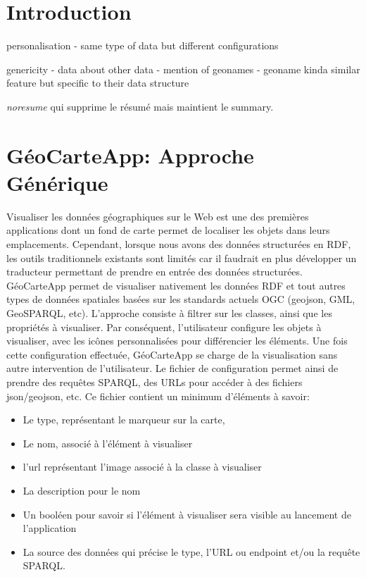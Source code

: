 \documentclass[a4paper,pagenum,french,showlayout]{rnti}
\affiliation{
    \affil{1}Univ Lyon, MINES Saint-\'Etienne, CNRS, Laboratoire Hubert Curien UMR 5516, \\F-42023 Saint-\'Etienne, France\\
          \{prenom.nom\}@emse.fr\\
    \affil{2}Mondeca, \\ 35 boulevard Strasbourg, Paris, France\\
          ghislain.atemezing@mondeca.com\\
 }
\begin{document}
%
\section{Introduction}

personalisation
- same type of data but different configurations

genericity
- data about other data
- mention of geonames
    - geoname kinda similar feature but specific to their data structure
    
\textit{noresume} qui supprime le résumé mais maintient le summary.

\section{GéoCarteApp: Approche Générique}
Visualiser les données géographiques sur le Web est une des premières applications dont un fond de carte permet de localiser les objets dans leurs emplacements. Cependant, lorsque nous avons des données structurées en RDF, les outils traditionnels existants sont limités car il faudrait en plus développer un traducteur permettant de prendre en entrée des données structurées. GéoCarteApp permet de visualiser nativement les données RDF et tout autres types de données spatiales basées sur les standards actuels OGC (geojson, GML, GeoSPARQL, etc). L’approche consiste à filtrer sur les classes, ainsi que les propriétés à visualiser. Par conséquent, l’utilisateur configure les objets à visualiser, avec les icônes personnalisées pour différencier les éléments. Une fois cette configuration effectuée, GéoCarteApp se charge de la visualisation sans autre intervention de l'utilisateur.
	Le fichier de configuration permet ainsi de prendre des requêtes SPARQL, des URLs pour accéder à des fichiers json/geojson, etc. Ce fichier contient un minimum d’éléments à savoir:
	\begin{itemize}
	\item Le type, représentant le marqueur sur la carte,
	\item Le nom, associé à l’élément à visualiser
	\item l’url représentant l’image associé à la classe à visualiser
	\item La description pour le nom
	\item Un booléen pour savoir si l’élément à visualiser sera visible au lancement de l’application
	\item La source des données qui précise le type, l’URL ou endpoint et/ou la requête SPARQL.
	\end{itemize}
\end{document}
